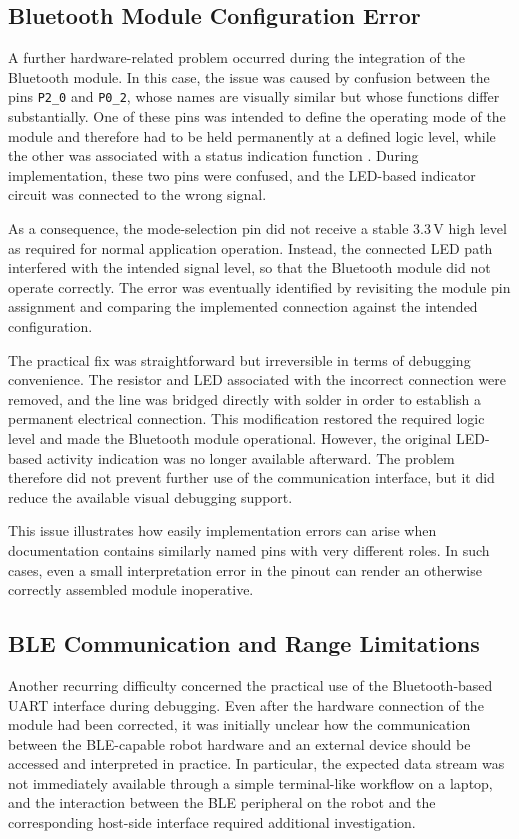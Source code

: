 \subsection{Bluetooth Module Configuration Error}

A further hardware-related problem occurred during the integration of the Bluetooth module. In this case, the issue was caused by confusion between the pins \texttt{P2\_0} and \texttt{P0\_2}, whose names are visually similar but whose functions differ substantially. One of these pins was intended to define the operating mode of the module and therefore had to be held permanently at a defined logic level, while the other was associated with a status indication function \cite{datasheet_bluetooth}. During implementation, these two pins were confused, and the LED-based indicator circuit was connected to the wrong signal.

As a consequence, the mode-selection pin did not receive a stable 3.3\,V high level as required for normal application operation. Instead, the connected LED path interfered with the intended signal level, so that the Bluetooth module did not operate correctly. The error was eventually identified by revisiting the module pin assignment and comparing the implemented connection against the intended configuration.

The practical fix was straightforward but irreversible in terms of debugging convenience. The resistor and LED associated with the incorrect connection were removed, and the line was bridged directly with solder in order to establish a permanent electrical connection. This modification restored the required logic level and made the Bluetooth module operational. However, the original LED-based activity indication was no longer available afterward. The problem therefore did not prevent further use of the communication interface, but it did reduce the available visual debugging support.

This issue illustrates how easily implementation errors can arise when documentation contains similarly named pins with very different roles. In such cases, even a small interpretation error in the pinout can render an otherwise correctly assembled module inoperative.

\subsection{BLE Communication and Range Limitations}

Another recurring difficulty concerned the practical use of the Bluetooth-based UART interface during debugging. Even after the hardware connection of the module had been corrected, it was initially unclear how the communication between the BLE-capable robot hardware and an external device should be accessed and interpreted in practice. In particular, the expected data stream was not immediately available through a simple terminal-like workflow on a laptop, and the interaction between the BLE peripheral on the robot and the corresponding host-side interface required additional investigation.

